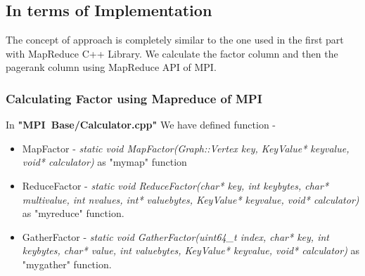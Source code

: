 \documentclass{article}
\begin{document}
    \clearpage
    
    \subsection{In terms of Implementation}  
    
    The concept of approach is completely similar to the one used in the first part with MapReduce C++ Library. We calculate the factor column and then the pagerank column using MapReduce API of MPI. 
    
    \subsubsection{Calculating Factor using Mapreduce of MPI}
    In \textbf{"MPI\ Base/Calculator.cpp"} We have defined function - 
    \begin{itemize}
        \item MapFactor - \textit{static void MapFactor(Graph::Vertex key, KeyValue* keyvalue, void*
        calculator)} as "mymap" function
        \item ReduceFactor - \textit{static void ReduceFactor(char* key, int keybytes, char* multivalue, int nvalues, int* valuebytes, KeyValue* keyvalue, void* calculator)} as "myreduce" function.
        \item GatherFactor - \textit{static void GatherFactor(uint64\_t index, char* key, int keybytes, char* value, int valuebytes, KeyValue* keyvalue, void* calculator)} as "mygather" function.
    \end{itemize}
    
    
\end{document}
